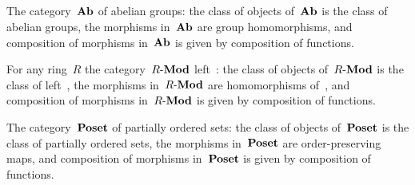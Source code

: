 \subsection{}

The category~$\mathbf{Ab}$ of abelian groups:
the class of objects of~$\mathbf{Ab}$ is the class of abelian groups, the morphisms in~$\mathbf{Ab}$ are group homomorphisms, and composition of morphisms in~$\mathbf{Ab}$ is given by composition of functions.

For any ring~$R$ the category~$R\text{-}\mathbf{Mod}$ left~:
the class of objects of~$R\text{-}\mathbf{Mod}$ is the class of left~, the morphisms in~$R\text{-}\mathbf{Mod}$ are homomorphisms of~, and composition of morphisms in~$R\text{-}\mathbf{Mod}$ is given by composition of functions.

The category~$\mathbf{Poset}$ of partially ordered sets:
the class of objects of~$\mathbf{Poset}$ is the class of partially ordered sets, the morphisms in~$\mathbf{Poset}$ are order-preserving maps, and composition of morphisms in~$\mathbf{Poset}$ is given by composition of functions.

